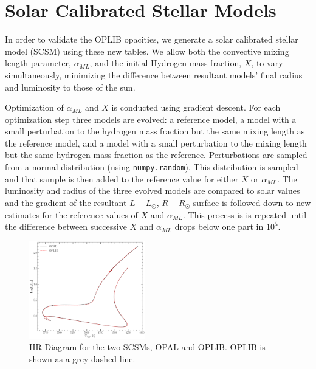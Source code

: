 \section{Solar Calibrated Stellar Models}\label{sec:SCSM}


In order to validate the OPLIB opacities, we generate a solar calibrated
stellar model (SCSM) using these new tables. We allow both the convective
mixing length parameter, $\alpha_{ML}$, and the initial Hydrogen mass fraction,
$X$, to vary simultaneously, minimizing the difference between resultant
models' final radius and luminosity to those of the sun.

Optimization of $\alpha_{ML}$ and $X$ is conducted using gradient descent. For
each optimization step three models are evolved: a reference model, a model
with a small perturbation to the hydrogen mass fraction but the same mixing
length as the reference model, and a model with a small perturbation to the
mixing length but the same hydrogen mass fraction as the reference.
Perturbations are sampled from a normal distribution (using
\texttt{numpy.random}). This distribution is sampled and that sample is then
added to the reference value for either $X$ or $\alpha_{ML}$. The luminosity
and radius of the three evolved models are compared to solar values and the
gradient of the resultant $L-L_{\odot}$, $R-R_{\odot}$ surface is followed down
to new estimates for the reference values of $X$ and $\alpha_{ML}$. This
process is is repeated until the difference between successive $X$ and
$\alpha_{ML}$ drops below one part in $10^{5}$.

\begin{figure}
	\centering
	\includegraphics[width=0.45\textwidth]{src/figures/HRDiagramOPALvsOPLIB_SCCM.pdf}
	\caption{HR Diagram for the two SCSMs, OPAL and OPLIB. OPLIB is shown as a grey
	dashed line.}
	\label{fig:OPLIBOPALHR}
\end{figure}

